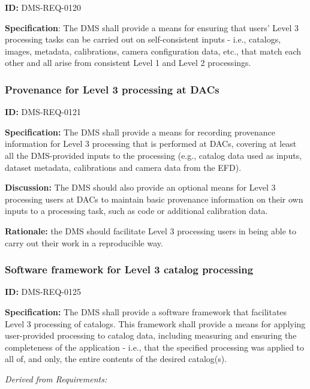 \documentclass[SE,toc,lsstdraft]{lsstdoc}
\begin{document}
\label{DMS-REQ-0120}
\textbf{ID:} DMS-REQ-0120

\textbf{Specification}: The DMS shall provide a means for ensuring that users' Level 3 processing tasks can be carried out on self-consistent inputs - i.e., catalogs, images, metadata, calibrations, camera configuration data, etc., that match each other and all arise from consistent Level 1 and Level 2 processings.






\subsubsection{Provenance for Level 3 processing at DACs}

\label{DMS-REQ-0121}
\textbf{ID:} DMS-REQ-0121

\textbf{Specification:} The DMS shall provide a means for recording provenance information for Level 3 processing that is performed at DACs, covering at least all the DMS-provided inputs to the processing (e.g., catalog data used as inputs, dataset metadata, calibrations and camera data from the EFD).

\textbf{Discussion:} The DMS should also provide an optional means for Level 3 processing users at DACs to maintain basic provenance information on their own inputs to a processing task, such as code or additional calibration data.

\textbf{Rationale:} the DMS should facilitate Level 3 processing users in being able to carry out their work in a reproducible way.




\subsubsection{Software framework for Level 3 catalog processing}

\label{DMS-REQ-0125}
\textbf{ID:} DMS-REQ-0125

\textbf{Specification:} The DMS shall provide a software framework that facilitates Level 3 processing of catalogs.  This framework shall provide a means for applying user-provided processing to catalog data, including measuring and ensuring the completeness of the application - i.e., that the specified processing was applied to all of, and only, the entire contents of the desired catalog(s).






\emph{Derived from Requirements:}
\end{document}
